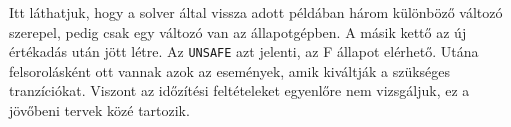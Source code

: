 Itt láthatjuk, hogy a solver által vissza adott példában három különböző változó szerepel, pedig csak egy változó van az állapotgépben. A másik kettő az új értékadás után jött létre. Az \verb+UNSAFE+ azt jelenti, az F állapot elérhető. Utána felsorolásként ott vannak azok az események, amik kiváltják a szükséges tranzíciókat. Viszont az időzítési feltételeket egyenlőre nem vizsgáljuk, ez a jövőbeni tervek közé tartozik.

